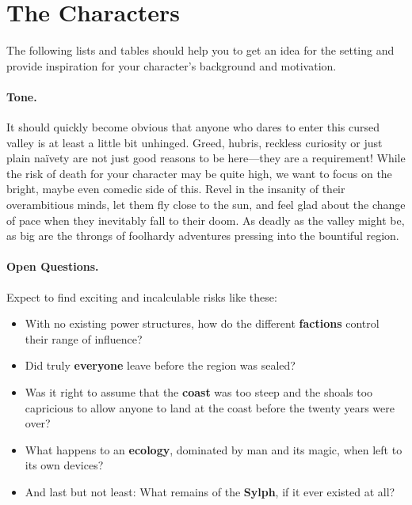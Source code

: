 \section{The Characters}\label{_characters}

The following lists and tables should help you to get an idea for the
setting and provide inspiration for your character's background and
motivation.

\paragraph{Tone.} It should quickly become obvious that anyone who dares to enter this
cursed valley is at least a little bit unhinged. Greed, hubris, reckless
curiosity or just plain naïvety are not just good reasons to be
here---they are a requirement! While the risk of death for your
character may be quite high, we want to focus on the bright, maybe even
comedic side of this.
Revel in the insanity of their overambitious minds, let them fly close to the sun, and feel glad about the change of pace when they inevitably fall to their doom.
As deadly as the valley
might be, as big are the throngs of foolhardy adventures pressing into
the bountiful region.

\pagebreak

\paragraph{Open Questions.}
Expect to find exciting and incalculable risks like these:

\begin{itemize}
	\item
	      With no existing power structures, how do the different
	      \textbf{factions} control their range of influence?
	\item
	      Did truly \textbf{everyone} leave before the region was sealed?
	\item
	      Was it right to assume that the \textbf{coast} was too steep and the
	      shoals too capricious to allow anyone to land at the coast before the
	      twenty years were over?
	\item
	      What happens to an \textbf{ecology}, dominated by man and its magic,
	      when left to its own devices?
	\item
	      And last but not least: What remains of the \textbf{Sylph}, if it ever
	      existed at all?
\end{itemize}

